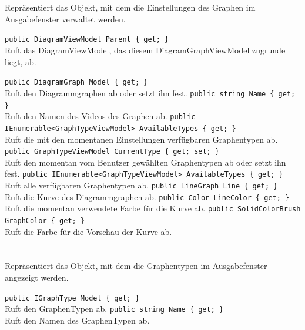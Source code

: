 \paragraph{}~\\
Repräsentiert das Objekt, mit dem die Einstellungen des Graphen im Ausgabefenster verwaltet werden.
\begin{itemize}
	\add \verb!public DiagramViewModel Parent { get; }! \\
	Ruft das DiagramViewModel, das diesem DiagramGraphViewModel zugrunde liegt, ab.
	
	\add \verb!public DiagramGraph Model { get; }! \\
	Ruft den Diagrammgraphen ab oder setzt ihn fest.
	\add \verb!public string Name { get; }! \\
	Ruft den Namen des Videos des Graphen ab.
	\add \verb!public IEnumerable<GraphTypeViewModel> AvailableTypes { get; }! \\
	Ruft die mit den momentanen Einstellungen verfügbaren Graphentypen ab.
	\add \verb!public GraphTypeViewModel CurrentType { get; set; }! \\
	Ruft den momentan vom Benutzer gewählten Graphentypen ab oder setzt ihn fest.
	\add \verb!public IEnumerable<GraphTypeViewModel> AvailableTypes { get; }! \\
	Ruft alle verfügbaren Graphentypen ab.
	\add \verb!public LineGraph Line { get; }! \\
	Ruft die Kurve des Diagrammgraphen ab.
	\add \verb!public Color LineColor { get; }! \\
	Ruft die momentan verwendete Farbe für die Kurve ab.
	\add \verb!public SolidColorBrush GraphColor { get; }! \\
	Ruft die Farbe für die Vorschau der Kurve ab.
\end{itemize}

\paragraph{}~\\
Repräsentiert das Objekt, mit dem die Graphentypen im Ausgabefenster angezeigt werden.
\begin{itemize}
	\add \verb!public IGraphType Model { get; }! \\
	Ruft den GraphenTypen ab.
	\add \verb!public string Name { get; }! \\
	Ruft den Namen des GraphenTypen ab.
\end{itemize}

